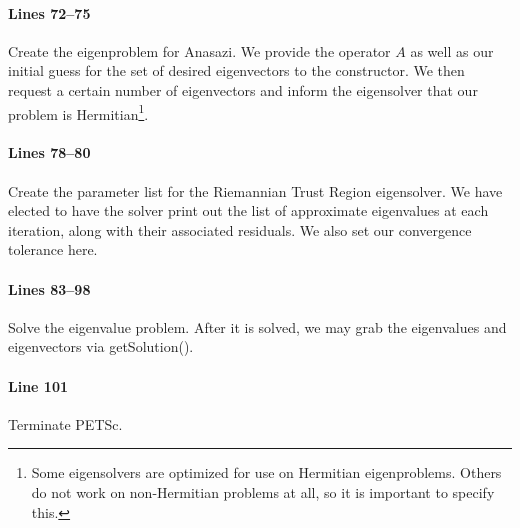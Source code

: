 \paragraph{Lines 72--75}
Create the eigenproblem for Anasazi.  We provide the operator $A$ as well as our
initial guess for the set of desired eigenvectors to the constructor.  We then
request a certain number of eigenvectors and inform the eigensolver that our
problem is Hermitian\footnote{Some eigensolvers are optimized for use on
Hermitian eigenproblems.  Others do not work on non-Hermitian problems at
all, so it is important to specify this.}.

\paragraph{Lines 78--80}
Create the parameter list for the Riemannian Trust Region eigensolver.  We have
elected to have the solver print out the list of approximate eigenvalues at each
iteration, along with their associated residuals.  We also set our convergence
tolerance here.

\paragraph{Lines 83--98}
Solve the eigenvalue problem.  After it is solved, we may grab the eigenvalues
and eigenvectors via getSolution().

\paragraph{Line 101}
Terminate PETSc.
